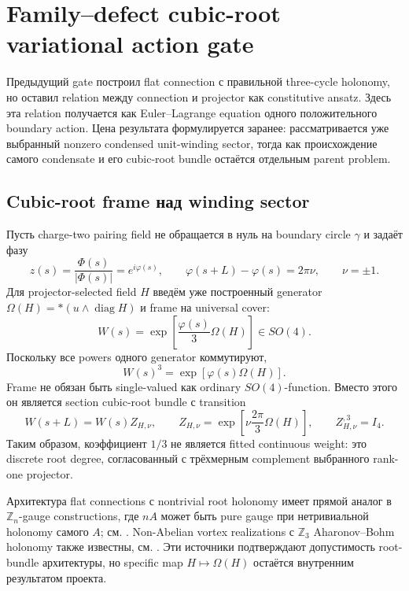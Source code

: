 \chapter{Family--defect cubic-root variational action gate}

Предыдущий gate построил flat connection с правильной three-cycle
holonomy, но оставил relation между connection и projector как constitutive
ansatz. Здесь эта relation получается как Euler--Lagrange equation одного
положительного boundary action. Цена результата формулируется заранее:
рассматривается уже выбранный nonzero condensed unit-winding sector, тогда
как происхождение самого condensate и его cubic-root bundle остаётся
отдельным parent problem.

\section{Cubic-root frame над winding sector}

Пусть charge-two pairing field не обращается в нуль на boundary circle
\(\gamma\) и задаёт фазу
\begin{equation}
 z(s)=\frac{\Phi(s)}{|\Phi(s)|}=e^{i\varphi(s)},
 \qquad
 \varphi(s+L)-\varphi(s)=2\pi\nu,
 \qquad
 \nu=\pm1.
 \label{eq:cubic-root-phase-winding}
\end{equation}
Для projector-selected field \(H\) введём уже построенный generator
\(\Omega(H)=*(u\wedge\operatorname{diag}H)\) и frame на universal cover:
\begin{equation}
 W(s)=\exp\!\left[\frac{\varphi(s)}{3}\Omega(H)\right]
 \in SO(4).
 \label{eq:cubic-root-frame}
\end{equation}
Поскольку все powers одного generator коммутируют,
\begin{equation}
 W(s)^3=\exp[\varphi(s)\Omega(H)].
\end{equation}
Frame не обязан быть single-valued как ordinary \(SO(4)\)-function. Вместо
этого он является section cubic-root bundle с transition
\begin{equation}
 W(s+L)=W(s)Z_{H,\nu},
 \qquad
 Z_{H,\nu}=\exp\!\left[\nu\frac{2\pi}{3}\Omega(H)\right],
 \qquad
 Z_{H,\nu}^{,3}=I_4.
 \label{eq:cubic-root-monodromy}
\end{equation}
Таким образом, коэффициент \(1/3\) не является fitted continuous weight:
это discrete root degree, согласованный с трёхмерным complement выбранного
rank-one projector.

Архитектура flat connections с nontrivial root holonomy имеет прямой
аналог в \(\mathbb Z_n\)-gauge constructions, где \(nA\) может быть pure
gauge при нетривиальной holonomy самого \(A\); см.
. Non-Abelian vortex realizations с
\(\mathbb Z_3\) Aharonov--Bohm holonomy также известны, см.
. Эти источники подтверждают допустимость root-bundle
архитектуры, но specific map \(H\mapsto\Omega(H)\) остаётся внутренним
результатом проекта.

